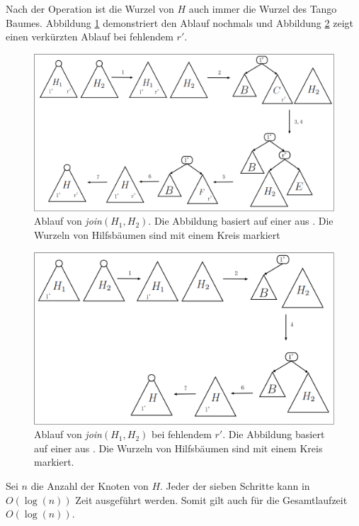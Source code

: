 \documentclass[a4paper,12pt]{article}
\begin{document}
Nach der Operation ist die Wurzel von $H$ auch immer die Wurzel des Tango Baumes. Abbildung \ref{fig:join} demonstriert den Ablauf nochmals und Abbildung \ref{fig:join2} zeigt einen verkürzten Ablauf bei fehlendem $r'$.
\begin{figure}[H]
	\centering
	\includegraphics[width=1\textwidth]{Medien/Tango/join}
	\caption{Ablauf von \textit{join}$(H_1, H_2)$. Die Abbildung basiert auf einer aus \cite{demainDinamicOpti}. Die Wurzeln von Hilfsbäumen sind mit einem Kreis markiert }
	\label{fig:join}
\end{figure}
\begin{figure}[H]
	\centering
	\includegraphics[width=1\textwidth]{Medien/Tango/join2}
	\caption{Ablauf von  \textit{join}$(H_1, H_2)$ bei fehlendem $r'$. Die Abbildung basiert auf einer aus \cite{demainDinamicOpti}. Die Wurzeln von Hilfsbäumen sind mit einem Kreis markiert. }
	\label{fig:join2}
\end{figure}

\noindent Sei $n$ die Anzahl der Knoten von $H$. Jeder der sieben Schritte kann in $O\left(\log \left(n\right)\right)$ Zeit ausgeführt werden. Somit gilt auch für die Gesamtlaufzeit $O\left(\log \left(n\right)\right)$.
\end{document}
